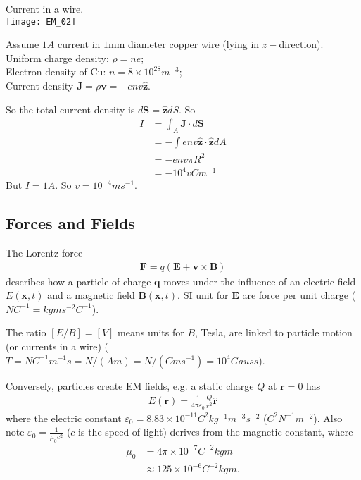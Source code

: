 \documentclass[a4paper]{article}
\begin{document}
\begin{eg} Current in a wire.\\

\texttt{[image: EM\_02]}

Assume $1 A$ current in $1$mm diameter copper wire (lying in $z-$direction).\\
Uniform charge density: $\rho = ne$;\\
Electron density of Cu: $n=8 \times 10^{28} m^{-3}$;\\
Current density $\mathbf{J} = \rho \mathbf{v} = -env\mathbf{\hat{z}}$.

So the total current density is $d\mathbf{S} = \mathbf{\hat{z}}dS$. So
\begin{equation*}
\begin{aligned}
I&=\int_A \mathbf{J} \cdot d\mathbf{S}\\
&=-\int env\mathbf{\hat{z}}\cdot \mathbf{\hat{z}} dA\\
&=-env\pi R^2\\
&=-10^4 vCm^{-1}
\end{aligned}
\end{equation*}
But $I=1A$. So $v=10^{-4} ms^{-1}$.

\subsection{Forces and Fields}
The Lorentz force
\begin{equation*}\tag{1.9} \label{eq:1.9}
\begin{aligned}
\mathbf{F} = q(\mathbf{E} + \mathbf{v} \times \mathbf{B})
\end{aligned}
\end{equation*}
describes how a particle of charge $\mathbf{q}$ moves under the influence of an electric field $E(\mathbf{x},t)$ and a magnetic field $\mathbf{B}(\mathbf{x},t)$. SI unit for $\mathbf{E}$ are force per unit charge ($NC^{-1} = kgms^{-2}C^{-1}$).

The ratio $[E/B] = [V]$ means units for $B$, Tesla, are linked to particle motion (or currents in a wire) ($T=NC^{-1}m^{-1} s = N/(Am) = N/(Cms^{-1}) = 10^4 Gauss$).

Conversely, particles create EM fields, e.g. a static charge $Q$ at $\mathbf{r} = 0$ has
\begin{equation*}\tag{1.10} \label{eq:1.10}
\begin{aligned}
E(\mathbf{r}) = \frac{1}{4\pi\varepsilon_0} \frac{Q}{r^2} \mathbf{\hat{r}}
\end{aligned}
\end{equation*}
where the electric constant $\varepsilon_0 = 8.83 \times 10^{-11} C^2 kg^{-1} m^{-3}s^{-2}$ ($C^2N^{-1}m^{-2}$). Also note $\varepsilon_0 = \frac{1}{\mu_0 c^2}$ ($c$ is the speed of light) derives from the magnetic constant, where
\begin{equation*}
\begin{aligned}
\mu_0 &= 4\pi \times 10^{-7} C^{-2}kgm\\
&\approx 125 \times 10^{-6} C^{-2} kgm.
\end{aligned}
\end{equation*}

\end{eg}
\end{document}
